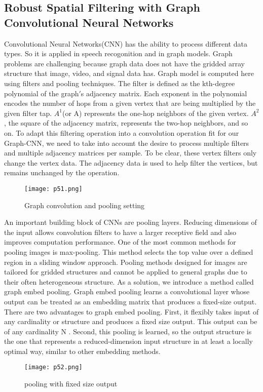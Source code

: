 \documentclass[10pt,a4paper,journal]{IEEEtran}
\begin{document}
\subsection{ Robust Spatial Filtering with Graph Convolutional
Neural Networks\cite{5}}
\hspace{2em} Convolutional Neural Networks(CNN) has the ability to process different data types. So it is applied in speech recogonition and in graph models. Graph problems are challenging because graph data does not
have the gridded array structure that image, video, and signal
data has. Graph model is computed here using filters and pooling techniques. The filter is defined as the kth-degree polynomial of the
graph$'$s adjacency matrix. Each exponent in the polynomial
encodes the number of hops from a given vertex that are being
multiplied by the given filter tap. $A^1$(or A) represents the
one-hop neighbors of the given vertex. $A^2$, the square of the
adjacency matrix, represents the two-hop neighbors, and so
on. To adapt this filtering operation into a convolution operation
fit for our Graph-CNN, we need to take into account the desire
to process multiple filters and multiple adjacency matrices per
sample. To be clear, these vertex filters only change the vertex data.
The adjacency data is used to help filter the vertices, but
remains unchanged by the operation.

\begin{figure}[htbp]
\begin{center}
\hbox{\texttt{[image: p51.png]}}
\caption{Graph convolution and pooling setting\cite{5}}
\label{4}
\end{center}
\end{figure} 
\hspace{2em} An important building block of CNNs are pooling layers.
Reducing dimensions of the input allows convolution filters to
have a larger receptive field and also improves computation
performance. One of the most common methods for pooling
images is max-pooling. This method selects the top value over
a defined region in a sliding window approach. Pooling methods designed for images are tailored for gridded structures and cannot be applied to general graphs due
to their often heterogeneous structure. As a solution, we
introduce a method called graph embed pooling. Graph embed
pooling learns a convolutional layer whose output can be
treated as an embedding matrix that produces a fixed-size
output. There are two advantages to graph embed pooling. First, it
flexibly takes input of any cardinality or structure and produces
a fixed size output. This output can be of any cardinality
N . Second, this pooling is learned, so the output structure
is the one that represents a reduced-dimension input structure
in at least a locally optimal way, similar to other embedding
methods.
\begin{figure}[htbp]
\begin{center}
 \hbox{\texttt{[image: p52.png]}}
\caption{pooling with fixed size output\cite{5}}
\label{4}   
\end{center}


\end{figure} 
\end{document}
